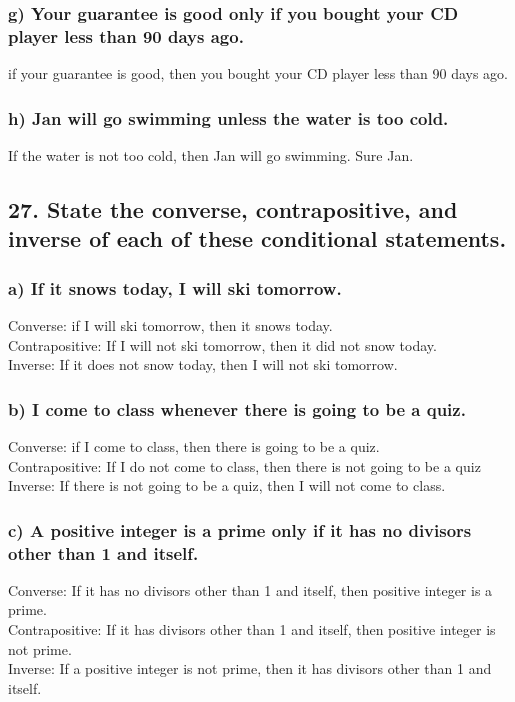 \documentclass[11pt, oneside]{article} %
\numberwithin{equation}{section} %
\numberwithin{figure}{section} %
\numberwithin{table}{section} %
\begin{document}
\subsubsection{g) Your guarantee is good only if you bought your CD
player less than 90 days ago.}
if your guarantee is good, then you bought your CD player less than 90 days ago.
\subsubsection{h) Jan will go swimming unless the water is too cold.}
If the water is not too cold, then Jan will go swimming. Sure Jan. 

\subsection{27. State the converse, contrapositive, and inverse of each of
these conditional statements.}
\subsubsection{a) If it snows today, I will ski tomorrow.}
Converse: if I will ski tomorrow, then it snows today.\\
Contrapositive: If I will not ski tomorrow, then it did not snow today.\\
Inverse: If it does not snow today, then I will not ski tomorrow.
\subsubsection{b) I come to class whenever there is going to be a quiz.}
Converse: if I come to class, then there is going to be a quiz.\\
Contrapositive: If I do not come to class, then there is not going to be a quiz\\
Inverse: If there is not going to be a quiz, then I will not come to class.
\subsubsection{c) A positive integer is a prime only if it has no divisors
other than 1 and itself.}
Converse: If it has no divisors other than 1 and itself, then positive integer is a prime.\\
Contrapositive: If it has divisors other than 1 and itself, then positive integer is not prime.\\
Inverse: If a positive integer is not prime, then it has divisors other than 1 and itself.
\end{document}
